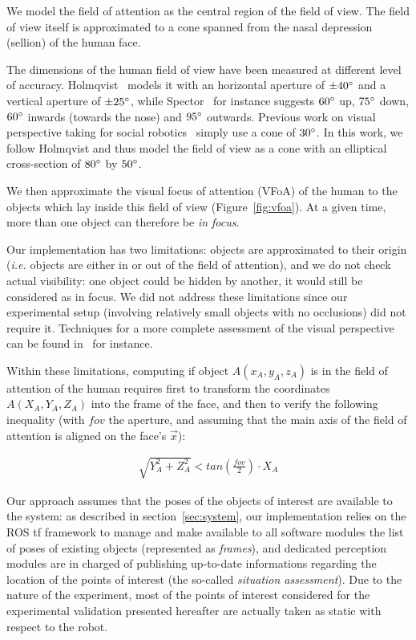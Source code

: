\documentclass{sig-alternate}
\newcommand{\ie}{\textit{i.e.}\xspace}
\begin{document}
We model the field of attention as the central region of the field of view.
The field of view itself is approximated to a cone spanned from the nasal
depression (sellion) of the human face.

The dimensions of the human field of view have been measured at different level
of accuracy. Holmqvist~\cite{holmqvist2011eye} models it with an horizontal
aperture of $ \pm 40\degree $ and a vertical aperture of $ \pm 25\degree $,
while Spector~\cite{walker1980clinical} for instance suggests $60\degree$ up,
$75\degree$ down, $60\degree$ inwards (towards the nose) and $95\degree$
outwards.  Previous work on visual perspective taking for social
robotics~\cite{sisbot2011situation} simply use a cone of $30\degree$.  In this
work, we follow Holmqvist and thus model the field of view as a cone with an elliptical
cross-section of $80\degree$ by $50\degree$.

We then approximate the visual focus of attention (VFoA) of the human to the
objects which lay inside this field of view (Figure~\ref{fig:vfoa}). At a
given time, more than one object can therefore be \emph{in focus}.

Our implementation has two limitations: objects are approximated to their origin
(\ie objects are either in or out of the field of attention), and we do not
check actual visibility: one object could be hidden by another, it would still
be considered as in focus. We did not address these limitations since our
experimental setup (involving relatively small objects with no occlusions) did
not require it. Techniques for a more complete assessment of the visual
perspective can be found in~\cite{sisbot2011situation} for instance.

Within these limitations, computing if object $A(x_A,y_A,z_A)$ is in the field
of attention of the human requires first to transform the coordinates
$A(X_A,Y_A,Z_A)$ into the frame of the face, and then to verify the following
inequality (with $fov$ the aperture, and assuming that the main axis of the
field of attention is aligned on the face's $\vec{x}$):

\begin{align}
    \sqrt{Y_A^2 + Z_A^2} < tan\left(\frac{fov}{2}\right) \cdot X_A
\label{eq:fov}
\end{align}

Our approach assumes that the poses of the objects of interest are available to
the system: as described in section~\ref{sec:system}, our implementation relies
on the ROS {\sc tf} framework to manage and make available to all software
modules the list of poses of existing objects (represented as {\it frames}), and
dedicated perception modules are in charged of publishing up-to-date
informations regarding the location of the points of interest (the so-called
\emph{situation assessment}). Due to the nature of the experiment, most of the
points of interest considered for the experimental validation presented
hereafter are actually taken as static with respect to the robot.
\end{document}
